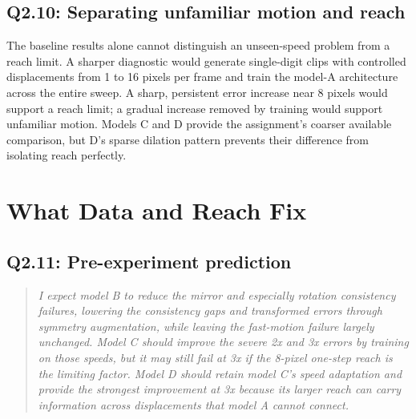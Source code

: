 \documentclass{article}
\begin{document}
\subsection*{Q2.10: Separating unfamiliar motion and reach}

The baseline results alone cannot distinguish an unseen-speed problem from a reach limit. A sharper diagnostic would generate single-digit clips with controlled displacements from 1 to 16 pixels per frame and train the model-A architecture across the entire sweep. A sharp, persistent error increase near 8 pixels would support a reach limit; a gradual increase removed by training would support unfamiliar motion. Models C and D provide the assignment's coarser available comparison, but D's sparse dilation pattern prevents their difference from isolating reach perfectly.

\section{What Data and Reach Fix}
\label{sec:q2-data}

\subsection*{Q2.11: Pre-experiment prediction}

\begin{quote}
\itshape
I expect model B to reduce the mirror and especially rotation consistency failures, lowering the consistency gaps and transformed errors through symmetry augmentation, while leaving the fast-motion failure largely unchanged. Model C should improve the severe 2x and 3x errors by training on those speeds, but it may still fail at 3x if the 8-pixel one-step reach is the limiting factor. Model D should retain model C's speed adaptation and provide the strongest improvement at 3x because its larger reach can carry information across displacements that model A cannot connect.
\end{quote}
\end{document}
